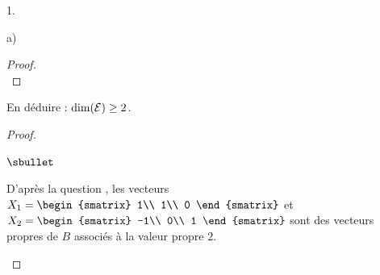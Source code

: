 \documentclass[11pt]{article}%
\begin{document}
\begin{noliste}{1.}
\begin{noliste}{a)}
\begin{proof}
      ~\\[-1.4cm]
    \end{proof}
    
    

    
  \item En déduire : $\dim({\cal E}) \geq 2$.
    
    \begin{proof}~
      \begin{noliste}{$\sbullet$}
	\item D'après la question , les vecteurs $X_1=
	\begin{smatrix}
	  1\\
	  1\\
	  0
	\end{smatrix}$ et $X_2 =
	\begin{smatrix}
	  -1\\
	  0\\
	  1
	\end{smatrix}$ sont des vecteurs propres de $B$ associés à la 
	valeur propre $2$.
	

\end{noliste}
\end{proof}
\end{noliste}
\end{noliste}
\end{document}
